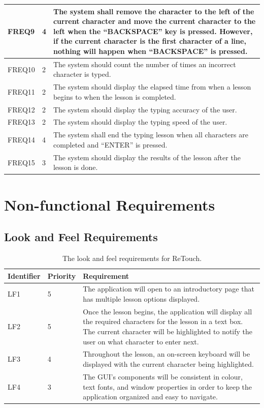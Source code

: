 \documentclass[12pt, titlepage]{article}
\begin{document}
\begin{longtable}{ |m{2cm}|m{1.8cm}|m{9.4cm}| }
    \hline
    FREQ9 & 4 & The system shall remove the character to the left of the current character and move the current character to the left when the “BACKSPACE” key is pressed. However, if the current character is the first character of a line, nothing will happen when “BACKSPACE” is pressed. \\ 
    \hline
    FREQ10 & 2 & The system should count the number of times an incorrect character is typed. \\ 
    \hline
    FREQ11 & 2 & The system should display the elapsed time from when a lesson begins to when the lesson is completed. \\ 
    \hline
    FREQ12 & 2 & The system should display the typing accuracy of the user. \\ 
    \hline
    FREQ13 & 2 & The system should display the typing speed of the user. \\ 
    \hline
    FREQ14 & 4 & The system shall end the typing lesson when all characters are completed and “ENTER” is pressed. \\ 
    \hline
    FREQ15 & 3 & The system should display the results of the lesson after the lesson is done. \\ 
    \hline

\end{longtable}

\section{Non-functional Requirements}
\subsection{Look and Feel Requirements}

\begin{table}[H]
  \caption{The look and feel requirements for ReTouch.}
\begin{tabular}{ |m{2cm}|m{1.8cm}|m{9.4cm}| }
    \hline
    \textbf{Identifier} & \textbf{Priority} & \textbf{Requirement} \\ 
    \hline
    LF1 & 5 & The application will open to an introductory page that has multiple lesson options displayed. \\ 
    \hline
    LF2 & 5 & Once the lesson begins, the application will display all the required characters for the lesson in a text box. The current character will be highlighted to notify the user on what character to enter next. \\ 
    \hline
    LF3 & 4 & Throughout the lesson, an on-screen keyboard will be displayed with the current character being highlighted. \\ 
    \hline
    LF4 & 3 & The GUI's components will be consistent in colour, text fonts, and window properties in order to keep the application organized and easy to navigate. \\ 
    \hline
\end{tabular}
\end{table}
\end{document}
